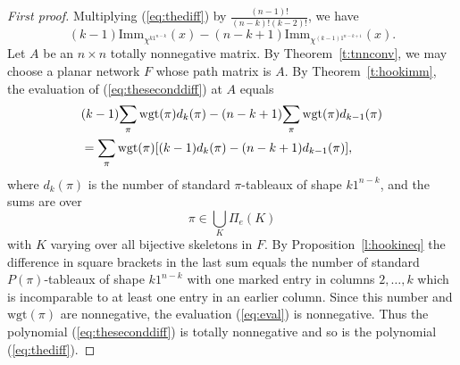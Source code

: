 \documentclass[12pt]{amsart}
\numberwithin{equation}{section}
\newcommand{\imm}[1]{\mathrm{Imm}_{#1}}
\newcommand{\wgt}{\mathrm{wgt}}
\newcommand{\ntnsp}{\negthinspace}
\newcommand{\nTksp}{\negthickspace\negthickspace}
\begin{document}
\begin{proof}[First proof]
        Multiplying (\ref{eq:thediff}) by $\tfrac{(n-1)!}{(n-k)!(k-2)!}$,
        we have
        \begin{equation}\label{eq:theseconddiff}
          (k-1)\imm{\chi^{k1^{n-k}}}(x) - (n-k+1)\imm{\chi^{(k-1)1^{n-k+1}}}(x).
        \end{equation}
        Let $A$ be an $n \times n$ totally nonnegative matrix.
        By Theorem~\ref{t:tnnconv}, we may choose a planar network $F$
        whose path matrix is $A$.
        By Theorem~\ref{t:hookimm},
        the evaluation of (\ref{eq:theseconddiff}) at $A$ equals
        \begin{equation}\label{eq:eval}
          \begin{aligned}
          &(k-1) \ntnsp \sum_\pi \wgt(\pi) d_k(\pi) -
          (n-k+1) \ntnsp \sum_\pi \wgt(\pi) d_{k-1}(\pi)\\
            &= \sum_\pi \wgt(\pi) [(k-1)d_k(\pi) - (n-k+1)d_{k-1}(\pi)],
          \end{aligned}
        \end{equation}
        where $d_k(\pi)$ is the number of standard $\pi$-tableaux
        of shape $k 1^{n-k}$, and
        the sums are over
        \begin{equation*}
          \pi \in \bigcup_K
          \Pi_e(K)
        \end{equation*}
        with $K$ varying over all bijective skeletons in $F$.
        By Proposition~\ref{l:hookineq}
        the difference in square brackets in the last sum equals
        the number of standard $P(\pi)$-tableaux
        of shape $k1^{n-k}$ with one marked
        entry in columns $2,\dotsc,k$ which is incomparable to at
        least one entry in an earlier column.
        Since this number and $\wgt(\pi)$ are nonnegative, the evaluation
        (\ref{eq:eval}) is nonnegative.  Thus the polynomial
        (\ref{eq:theseconddiff}) is totally nonnegative
        and so is the polynomial (\ref{eq:thediff}).
\end{proof}
\end{document}
